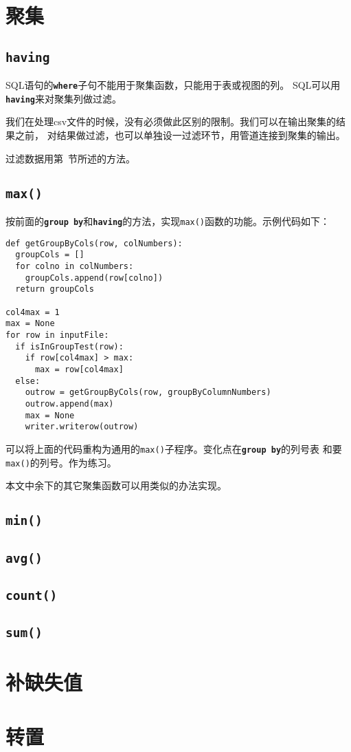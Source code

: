 \documentclass[11pt]{article}
\newcommand{\id}[1]{\texttt{#1}}
\newcommand{\kw}[1]{\texttt{\textbf{#1}}}
\begin{document}
\section{聚集}

 
\subsection{\kw{having}}
SQL语句的\kw{where}子句不能用于聚集函数，只能用于表或视图的列。
SQL可以用\kw{having}来对聚集列做过滤。

我们在处理csv文件的时候，没有必须做此区别的限制。我们可以在输出聚集的结果之前，
对结果做过滤，也可以单独设一过滤环节，用管道连接到聚集的输出。

过滤数据用第~\label{sec-filtering}节所述的方法。

\subsection{\id{max()}}
按前面的\kw{group by}和\kw{having}的方法，实现\id{max()}函数的功能。示例代码如下：
\begin{lstlisting}
def getGroupByCols(row, colNumbers):
  groupCols = []
  for colno in colNumbers:
    groupCols.append(row[colno])
  return groupCols

col4max = 1
max = None
for row in inputFile:
  if isInGroupTest(row):
    if row[col4max] > max:
      max = row[col4max]
  else:
    outrow = getGroupByCols(row, groupByColumnNumbers)
    outrow.append(max)
    max = None
    writer.writerow(outrow)
\end{lstlisting}

可以将上面的代码重构为通用的\id{max()}子程序。变化点在\kw{group by}的列号表
和要\id{max()}的列号。作为练习。 

本文中余下的其它聚集函数可以用类似的办法实现。
\subsection{\id{min()}}
\subsection{\id{avg()}}
\subsection{\id{count()}}
\subsection{\id{sum()}}

\section{补缺失值}

\section{转置}
\end{document}
